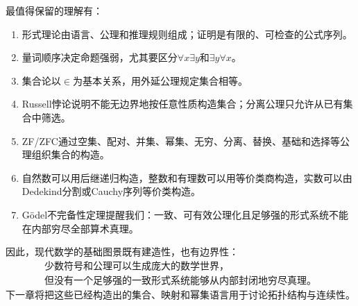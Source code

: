 最值得保留的理解有：
\begin{enumerate}
    \item 形式理论由语言、公理和推理规则组成；证明是有限的、可检查的公式序列。
    \item 量词顺序决定命题强弱，尤其要区分$\forall x\exists y$和$\exists y\forall x$。
    \item 集合论以$\in$为基本关系，用外延公理规定集合相等。
    \item Russell悖论说明不能无边界地按任意性质构造集合；分离公理只允许从已有集合中筛选。
    \item ZF/ZFC通过空集、配对、并集、幂集、无穷、分离、替换、基础和选择等公理组织集合的构造。
    \item 自然数可以用后继递归构造，整数和有理数可以用等价类商构造，实数可以由Dedekind分割或Cauchy序列等价类构造。
    \item Gödel不完备性定理提醒我们：一致、可有效公理化且足够强的形式系统不能在内部穷尽全部算术真理。
\end{enumerate}

因此，现代数学的基础图景既有建造性，也有边界性：
\[
    \boxed{\begin{gathered}
    \text{少数符号和公理可以生成庞大的数学世界，}\\
    \text{但没有一个足够强的一致形式系统能够从内部封闭地穷尽真理。}
    \end{gathered}}
\]
下一章将把这些已经构造出的集合、映射和幂集语言用于讨论拓扑结构与连续性。
